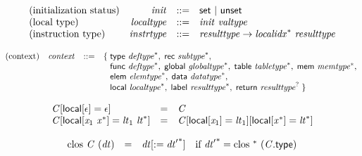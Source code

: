 $$
\begin{array}{@{}lrrl@{}l@{}}
\mbox{(initialization status)} & {\mathit{init}} &::=& \mathsf{set} ~|~ \mathsf{unset} \\
\mbox{(local type)} & {\mathit{localtype}} &::=& {\mathit{init}}~{\mathit{valtype}} \\
\mbox{(instruction type)} & {\mathit{instrtype}} &::=& {\mathit{resulttype}} \rightarrow {{\mathit{localidx}}^\ast}~{\mathit{resulttype}} \\
\end{array}
$$

\vspace{1ex}

$$
\begin{array}{@{}lrrl@{}l@{}}
\mbox{(context)} & {\mathit{context}} &::=& \{\; \begin{array}[t]{@{}l@{}l@{}}
\mathsf{type}~{{\mathit{deftype}}^\ast},\; \mathsf{rec}~{{\mathit{subtype}}^\ast},\; \\
  \mathsf{func}~{{\mathit{deftype}}^\ast},\; \mathsf{global}~{{\mathit{globaltype}}^\ast},\; \mathsf{table}~{{\mathit{tabletype}}^\ast},\; \mathsf{mem}~{{\mathit{memtype}}^\ast},\; \\
  \mathsf{elem}~{{\mathit{elemtype}}^\ast},\; \mathsf{data}~{{\mathit{datatype}}^\ast},\; \\
  \mathsf{local}~{{\mathit{localtype}}^\ast},\; \mathsf{label}~{{\mathit{resulttype}}^\ast},\; \mathsf{return}~{{\mathit{resulttype}}^?} \;\}\end{array} \\
\end{array}
$$

\vspace{1ex}

$$
\begin{array}{@{}lcl@{}l@{}}
{\mathit{C}}[\mathsf{local}[\epsilon] = \epsilon] &=& {\mathit{C}} &  \\
{\mathit{C}}[\mathsf{local}[{\mathit{x}}_{{1}}~{{\mathit{x}}^\ast}] = {\mathit{lt}}_{{1}}~{{\mathit{lt}}^\ast}] &=& {\mathit{C}}[\mathsf{local}[{\mathit{x}}_{{1}}] = {\mathit{lt}}_{{1}}][\mathsf{local}[{{\mathit{x}}^\ast}] = {{\mathit{lt}}^\ast}] &  \\
\end{array}
$$

\vspace{1ex}

$$
\begin{array}{@{}lcl@{}l@{}}
{\mathrm{clos}}~{\mathit{C}}~({\mathit{dt}}) &=& {{\mathit{dt}}}{[{ := }\;{{\mathit{dt}'}^\ast}]} &\quad
  \mbox{if}~{{\mathit{dt}'}^\ast} = {\mathrm{clos}}~{}^\ast~({\mathit{C}}.\mathsf{type}) \\
\end{array}
$$

